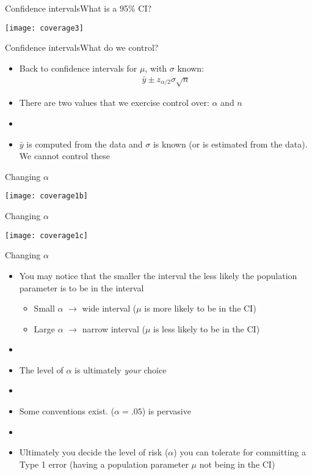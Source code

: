 \documentclass[xcolor=dvipsnames]{beamer}
\begin{document}
\begin{frame}{Confidence intervals}{What is a 95\% CI?}
\begin{center}
	\texttt{[image: coverage3]}
\end{center}
\end{frame}

\begin{frame}{Confidence intervals}{What do we control?}
\begin{itemize}
	\item Back to confidence intervals for $\mu$, with $\sigma$ known:
	\begin{gather*}
	\bar{y}\pm z_{\alpha/2} \sigma \sqrt{n}
	\end{gather*}
	\item There are two values that we exercise control over: $\alpha$ and $n$
	\item[]
	\item $\bar{y}$ is computed from the data and $\sigma$ is known (or is estimated from the data). We cannot control these
\end{itemize}
\end{frame}

\begin{frame}{Changing $\alpha$}
	\begin{center}
			\texttt{[image: coverage1b]}
	\end{center}
\end{frame}

\begin{frame}{Changing $\alpha$}
\begin{center}
	\texttt{[image: coverage1c]}
\end{center}
\end{frame}

\begin{frame}{Changing $\alpha$}
\begin{itemize}
	\item You may notice that the smaller the interval the less likely the population parameter is to be in the interval 
	\begin{itemize}
		\item Small $\alpha$ $\rightarrow$ wide interval ($\mu$ is more likely to be in the CI)
		\item Large $\alpha$ $\rightarrow$ narrow interval ($\mu$ is less likely to be in the CI)
	\end{itemize}
	\item[]
	\item The level of $\alpha$ is ultimately \emph{your} choice
	\item[]
	\item Some conventions exist. ($\alpha = .05$) is pervasive
	\item[]
	\item Ultimately you decide the level of risk ($\alpha$) you can tolerate for committing a Type 1 error (having a population parameter $\mu$ not being in the CI)
\end{itemize}
\end{frame}
\end{document}
